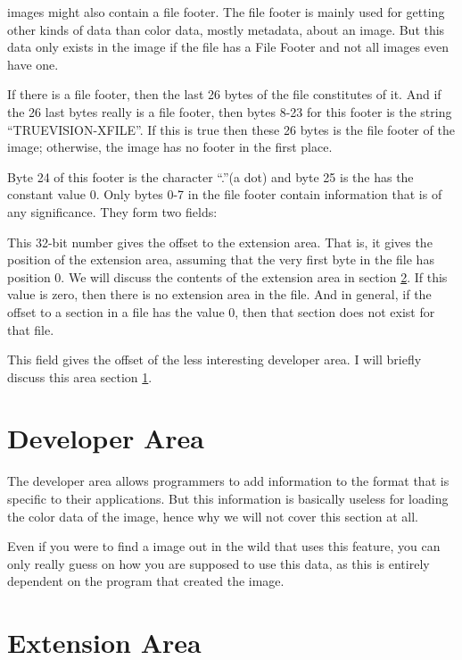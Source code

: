 \tga images might also contain a file footer. The file footer is mainly
used for getting other kinds of data than color data, mostly metadata,
about an image. But this data only exists in the image if the file has
a File Footer and not all \tga images even have one.

If there is a file footer, then the last 26 bytes of the file
constitutes of it. And if the 26 last bytes really is a file footer,
then bytes 8-23 for this footer is the \ascii string
``TRUEVISION-XFILE''. If this is true then these 26 bytes is the file
footer of the image; otherwise, the image has no footer in the first
place.

Byte 24 of this footer is the \ascii character ``.''(a dot) and byte
25 is the has the constant value $0$. Only bytes 0-7 in the file
footer contain information that is of any significance. They form two
fields:


This 32-bit number gives the offset to the extension area. That is, it
gives the position of the extension area, assuming that the very first
byte in the file has position 0. We will discuss the contents of the
extension area in section \ref{sec:tga-extension-area}. If this value
is zero, then there is no extension area in the file. And in general,
if the offset to a section in a file has the value $0$, then that
section does not exist for that file.


This field gives the offset of the less interesting developer area. I
will briefly discuss this area section \ref{sec:developer-area}.

\section{Developer Area}
\label{sec:developer-area}

The developer area allows programmers to add information to the \tga
format that is specific to their applications. But this information is
basically useless for loading the color data of the \tga image, hence
why we will not cover this section at all.

Even if you were to find a \tga image out in the wild that uses this
feature, you can only really guess on how you are supposed to use this
data, as this is entirely dependent on the program that created the
image.

\section{Extension Area}
\label{sec:tga-extension-area}

